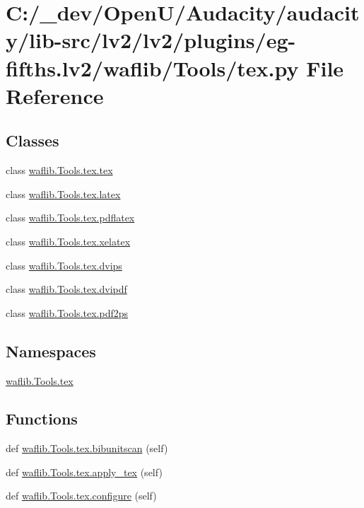 \hypertarget{lv2_2plugins_2eg-fifths_8lv2_2waflib_2_tools_2tex_8py}{}\section{C\+:/\+\_\+dev/\+Open\+U/\+Audacity/audacity/lib-\/src/lv2/lv2/plugins/eg-\/fifths.lv2/waflib/\+Tools/tex.py File Reference}
\label{lv2_2plugins_2eg-fifths_8lv2_2waflib_2_tools_2tex_8py}
\subsection*{Classes}
\begin{DoxyCompactItemize}
\item 
class \hyperlink{classwaflib_1_1_tools_1_1tex_1_1tex}{waflib.\+Tools.\+tex.\+tex}
\item 
class \hyperlink{classwaflib_1_1_tools_1_1tex_1_1latex}{waflib.\+Tools.\+tex.\+latex}
\item 
class \hyperlink{classwaflib_1_1_tools_1_1tex_1_1pdflatex}{waflib.\+Tools.\+tex.\+pdflatex}
\item 
class \hyperlink{classwaflib_1_1_tools_1_1tex_1_1xelatex}{waflib.\+Tools.\+tex.\+xelatex}
\item 
class \hyperlink{classwaflib_1_1_tools_1_1tex_1_1dvips}{waflib.\+Tools.\+tex.\+dvips}
\item 
class \hyperlink{classwaflib_1_1_tools_1_1tex_1_1dvipdf}{waflib.\+Tools.\+tex.\+dvipdf}
\item 
class \hyperlink{classwaflib_1_1_tools_1_1tex_1_1pdf2ps}{waflib.\+Tools.\+tex.\+pdf2ps}
\end{DoxyCompactItemize}
\subsection*{Namespaces}
\begin{DoxyCompactItemize}
\item 
 \hyperlink{namespacewaflib_1_1_tools_1_1tex}{waflib.\+Tools.\+tex}
\end{DoxyCompactItemize}
\subsection*{Functions}
\begin{DoxyCompactItemize}
\item 
def \hyperlink{namespacewaflib_1_1_tools_1_1tex_a0995543408e2b3f7705b148ffcce08b3}{waflib.\+Tools.\+tex.\+bibunitscan} (self)
\item 
def \hyperlink{namespacewaflib_1_1_tools_1_1tex_ac13f6c937ac7ea4af8d30e2a71f312f0}{waflib.\+Tools.\+tex.\+apply\+\_\+tex} (self)
\item 
def \hyperlink{namespacewaflib_1_1_tools_1_1tex_a63e6ed812ce192be695521518632025a}{waflib.\+Tools.\+tex.\+configure} (self)
\end{DoxyCompactItemize}
